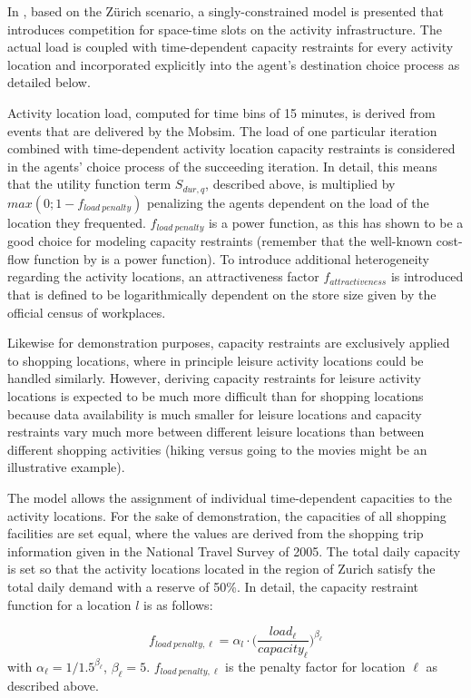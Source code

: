In \citet[][]{HorniEtAl_TRR_2009}, based on the Zürich scenario, a singly-constrained model is presented that introduces competition for space-time slots on the activity infrastructure. The actual load is coupled with time-dependent capacity restraints for every activity location and incorporated explicitly into the agent's destination choice process as detailed below. 

Activity location load, computed for time bins of 15 minutes, is derived from events that are delivered by the Mobsim. The load of one particular iteration combined with time-dependent activity location capacity restraints is considered in the agents' choice process of the succeeding iteration. In detail, this means that the utility function term $S_{dur,q}$, described above, is multiplied by $max(0; 1 - f_{load\ penalty})$ penalizing the agents dependent on the load of the location they frequented. $f_{load\ penalty}$ is a power function, as this has shown to be a good choice for modeling capacity restraints (remember that the well-known cost-flow function by \citet[][]{TA_manual_1964} is a power function). To introduce additional heterogeneity regarding the activity locations, an attractiveness factor $f_{attractiveness}$ is introduced that is defined to be logarithmically dependent on the store size given by the official census of workplaces.

Likewise for demonstration purposes, capacity restraints are exclusively applied to shopping locations, where in principle leisure activity locations could be handled similarly. However, deriving capacity restraints for leisure activity locations is expected to be much more difficult than for shopping locations because data availability is much smaller for leisure locations and capacity restraints vary much more between different leisure locations than between different shopping activities (hiking versus going to the movies might be an illustrative example).

The model allows the assignment of individual time-dependent capacities to the activity locations. For the sake of demonstration, the capacities of all shopping facilities are set equal, where the values are derived from the shopping trip information given in the National Travel Survey of 2005. The total daily capacity is set so that the activity locations located in the region of Zurich satisfy the total daily demand with a reserve of 50\%. In detail, the capacity restraint function for a location $l$ is as follows:

\[
f_{load\ penalty, \ell}=\alpha_l \cdot \Bigg(\frac{load_{\ell}}{capacity_{\ell}}\Bigg)^{\beta_\ell}
\]
with $\alpha_\ell=1/1.5^{\beta_\ell}$, $\beta_\ell=5$. $f_{load\ penalty, \ell}$ is the penalty factor for location $\ell$ as described above.

